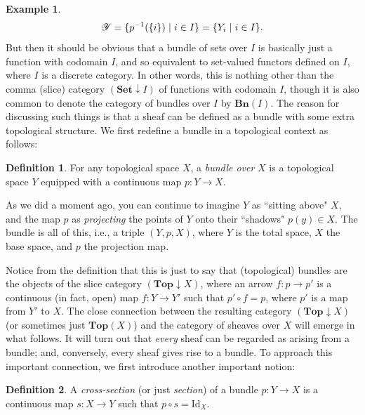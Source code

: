 \documentclass[a4paper]{book}
\theoremstyle{definition}
\newtheorem{example}{Example}[section]
\theoremstyle{definition}
\newtheorem{definition}{Definition}[section]
\theoremstyle{definition}
\theoremstyle{theorem}
\theoremstyle{definition}
\begin{document}
\begin{example}
\begin{equation*}
	\mathscr{Y} = \{p^{-1}(\{i\}) \hspace*{0.3em}| \hspace*{0.3em} i \in I \} = \{Y_i \hspace*{0.3em}| \hspace*{0.3em}i \in I \} .
\end{equation*}
	But then it should be obvious that a bundle of sets over $I$ is basically just a function with codomain $I$, and so equivalent to set-valued functors defined on $I$, where $I$ is a discrete category. In other words, this is nothing other than the comma (slice) category $(\textbf{Set}  \downarrow I)$ of functions with codomain $I$, though it is also common to denote the category of bundles over $I$ by $\textbf{Bn}(I)$. The reason for discussing such things is that a sheaf can be defined as a bundle with some extra topological structure. We first redefine a bundle in a topological context as follows: 
	\begin{definition} For any topological space $X$, a \textit{bundle over} $X$ is a topological space $Y$ equipped with a continuous map $p: Y \rightarrow X$. 
	\end{definition} \noindent 
As we did a moment ago, you can continue to imagine $Y$ as ``sitting above" $X$, and the map $p$ as \textit{projecting} the points of $Y$ onto their ``shadows" $p(y) \in X$. The bundle is all of this, i.e., a triple $(Y, p, X)$, where $Y$ is the total space, $X$ the base space, and $p$ the projection map. \par 
Notice from the definition that this is just to say that (topological) bundles are the objects of the slice category $(\textbf{Top} \downarrow X)$, where an arrow $f: p \rightarrow p'$ is a continuous (in fact, open) map $f: Y \rightarrow Y'$ such that $p' \circ f = p$, where $p'$ is a map from $Y'$ to $X$. The close connection between the resulting category $(\textbf{Top} \downarrow X)$ (or sometimes just $\textbf{Top}(X)$) and the category of sheaves over $X$ will emerge in what follows. It will turn out that \textit{every} sheaf can be regarded as arising from a bundle; and, conversely, every sheaf gives rise to a bundle. To approach this important connection, we first introduce another important notion: 
	\begin{definition}
		A \textit{cross-section} (or just \textit{section}) of a bundle $p: Y \rightarrow X$ is a continuous map $s: X \rightarrow Y$ such that $p \circ s = \text{Id}_X$. 

\end{definition}
\end{example}
\end{document}

